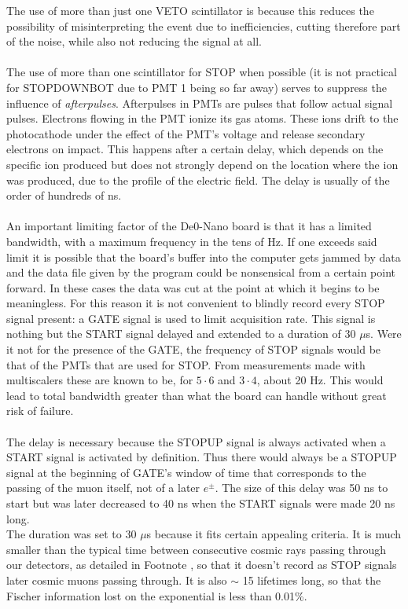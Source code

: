 \documentclass[10pt,a4paper,twocolumn]{article}
\begin{document}
The use of more than just one VETO scintillator is because this reduces the possibility of misinterpreting the event due to inefficiencies, cutting therefore part of the noise, while also not reducing the signal at all.
\\
\\
The use of more than one scintillator for STOP when possible (it is not practical for STOPDOWNBOT due to PMT 1 being so far away) serves to suppress the influence of \textit{afterpulses}. Afterpulses in PMTs are pulses that follow actual signal pulses. Electrons flowing in the PMT ionize its gas atoms. These ions drift to the photocathode under the effect of the PMT's voltage and release secondary electrons on impact. This happens after a certain delay, which depends on the specific ion produced but does not strongly depend on the location where the ion was produced, due to the profile of the electric field. The delay is usually of the order of hundreds of ns.
\\
\\
An important limiting factor of the De0-Nano board is that it has a limited bandwidth, with a maximum frequency in the tens of Hz. If one exceeds said limit it is possible that the board's buffer into the computer gets jammed by data and the data file given by the program could be nonsensical from a certain point forward. In these cases the data was cut at the point at which it begins to be meaningless. For this reason it is not convenient to blindly record every STOP signal present: a GATE signal is used to limit acquisition rate. This signal is nothing but the START signal delayed and extended to a duration of 30 $\mu$s. Were it not for the presence of the GATE, the frequency of STOP signals would be that of the PMTs that are used for STOP. From measurements made with multiscalers these are known to be, for $5\cdot 6$ and $3\cdot 4$, about 20 Hz. This would lead to total bandwidth greater than what the board can handle without great risk of failure.
\\
\\
The delay is necessary because the STOPUP signal is always activated when a START signal is activated by definition. Thus there would always be a STOPUP signal at the beginning of GATE's window of time that corresponds to the passing of the muon itself, not of a later $e^\pm$. The size of this delay was 50 ns to start but was later decreased to 40 ns when the START signals were made 20 ns long.
\\
The duration was set to 30 $\mu$s because it fits certain appealing criteria. It is much smaller than the typical time between consecutive cosmic rays passing through our detectors, as detailed in Footnote , so that it doesn't record as STOP signals later cosmic muons passing through. It is also $\sim$ 15 lifetimes long, so that the Fischer information lost on the exponential is less than 0.01\%.
\end{document}
